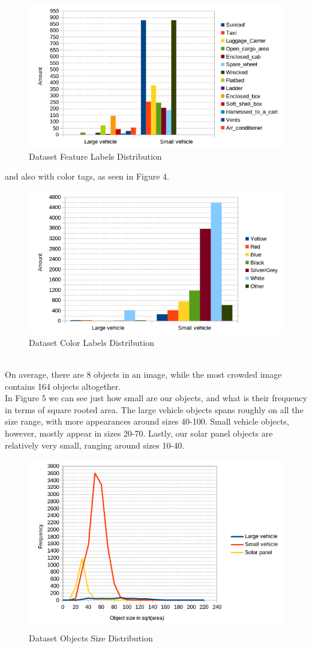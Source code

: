\documentclass[]{article}
\begin{document}
\begin{figure}[!h]
\centering
\includegraphics[width=0.7\linewidth]{"charts/Dataset Feature Labels Distribution"}
\caption{Dataset Feature Labels Distribution}
\label{fig:Dataset Feature Labels Distribution}
\end{figure}
and also with color tags, as seen in Figure 4.
\begin{figure}[!h]
\centering
\includegraphics[width=0.7\linewidth]{"charts/Dataset Color Labels Distribution"}
\caption{Dataset Color Labels Distribution}
\label{fig:Dataset Color Labels Distribution}
\end{figure}
\\
On average, there are 8 objects in an image, while the most crowded image contains 164 objects altogether.\\

In Figure 5 we can see just how small are our objects, and what is their frequency in terms of square rooted area. The large vehicle objects spans roughly on all the size range, with more appearances around sizes 40-100. Small vehicle objects, however, mostly appear in sizes 20-70. Lastly, our solar panel objects are relatively very small, ranging around sizes 10-40.
\begin{figure}[!h]
\centering
\includegraphics[width=0.7\linewidth]{"charts/Dataset Objects Size Distribution"}
\caption{Dataset Objects Size Distribution}
\label{fig:Dataset Objects Size Distribution}
\end{figure}
\end{document}
